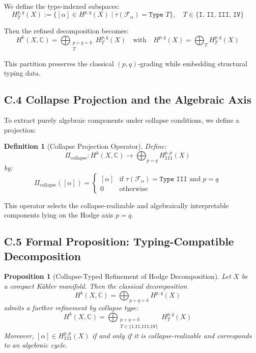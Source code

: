\documentclass[11pt]{article}
\newtheorem{definition}[theorem]{Definition}
\newtheorem{proposition}[theorem]{Proposition}
\begin{document}
We define the type-indexed subspaces:
\[
H^{p,q}_T(X) := \{ [\alpha] \in H^{p,q}(X) \mid \tau(\mathcal{F}_\alpha) = \texttt{Type } T \}, \quad T \in \{ \texttt{I, II, III, IV} \}
\]

Then the refined decomposition becomes:
\[
H^k(X, \mathbb{C}) = \bigoplus_{\substack{p+q = k \\ T}} H^{p,q}_T(X)
\quad \text{with} \quad H^{p,q}(X) = \bigoplus_T H^{p,q}_T(X)
\]

This partition preserves the classical $(p,q)$-grading while embedding structural typing data.

\subsection*{C.4 Collapse Projection and the Algebraic Axis}

To extract purely algebraic components under collapse conditions, we define a projection:

\begin{definition}[Collapse Projection Operator]
Define:
\[
\Pi_{\text{collapse}}: H^k(X, \mathbb{C}) \to \bigoplus_{p=q} H^{p,p}_{\texttt{III}}(X)
\]
by:
\[
\Pi_{\text{collapse}}([\alpha]) =
\begin{cases}
[\alpha] & \text{if } \tau(\mathcal{F}_\alpha) = \texttt{Type III} \text{ and } p = q \\
0 & \text{otherwise}
\end{cases}
\]
\end{definition}

This operator selects the collapse-realizable and algebraically interpretable components lying on the Hodge axis $p = q$.

\subsection*{C.5 Formal Proposition: Typing-Compatible Decomposition}

\begin{proposition}[Collapse-Typed Refinement of Hodge Decomposition]
Let $X$ be a compact Kähler manifold. Then the classical decomposition
\[
H^k(X, \mathbb{C}) = \bigoplus_{p+q=k} H^{p,q}(X)
\]
admits a further refinement by collapse type:
\[
H^k(X, \mathbb{C}) = \bigoplus_{\substack{p+q=k \\ T \in \{\texttt{I,II,III,IV}\}}} H^{p,q}_T(X)
\]
Moreover, $[\alpha] \in H^{p,p}_{\texttt{III}}(X)$ if and only if it is collapse-realizable and corresponds to an algebraic cycle.
\end{proposition}
\end{document}
